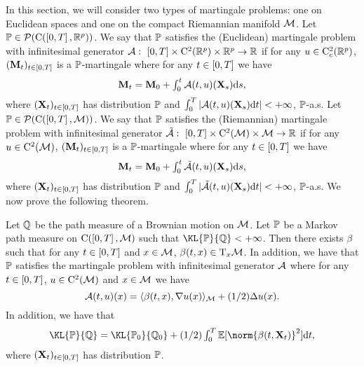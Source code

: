 In this section, we will consider two types of martingale problems: one on
Euclidean spaces and one on the compact Riemannian manifold $\mathcal M$. Let
$\mathbb{P} \in \mathcal{P}(\mathrm{C}(\left[0,T\right], \mathbb{R}^p))$. We say that $\mathbb{P}$ satisfies the
(Euclidean) martingale problem with infinitesimal generator
$\mathcal{A}: \ \left[0,T\right] \times \mathrm{C}^2(\mathbb{R}^p) \times \mathbb{R}^p \to \mathbb{R}$ if
for any $u \in \mathrm{C}_c^2(\mathbb{R}^p)$, $(\mathbf{M}_t)_{t \in \left[0,T\right]}$ is a
$\mathbb{P}$-martingale where for any $t \in \left[0,T\right]$ we have
\begin{equation}
  \textstyle{
    \mathbf{M}_t = \mathbf{M}_0 + \int_0^t \mathcal{A}(t, u)(\mathbf{X}_s) \mathrm{d}s  ,
    }
  \end{equation}
  where $(\mathbf{X}_t)_{t \in \left[0,T\right]}$ has distribution $\mathbb{P}$ and
  $\int_0^T \vert \mathcal{A}(t, u)(\mathbf{X}_s) \mathrm{d} t \vert <+\infty$, $\mathbb{P}$-a.s.
  Let $\mathbb{P} \in \mathcal{P}(\mathrm{C}(\left[0,T\right], \mathcal M))$. We say that $\mathbb{P}$ satisfies the
  (Riemannian) martingale problem with infinitesimal generator
  $\tilde{\mathcal{A}}: \ \left[0,T\right] \times \mathrm{C}^2(\mathcal M) \times \mathcal M \to \mathbb{R}$ if for any
  $u \in \mathrm{C}^2(\mathcal M)$, $(\mathbf{M}_t)_{t \in \left[0,T\right]}$ is a $\mathbb{P}$-martingale
  where for any $t \in \left[0,T\right]$ we have
\begin{equation}
  \textstyle{
    \mathbf{M}_t = \mathbf{M}_0 + \int_0^t \tilde{\mathcal{A}}(t, u)(\mathbf{X}_s) \mathrm{d}s  ,
    }
  \end{equation}
  where $(\mathbf{X}_t)_{t \in \left[0,T\right]}$ has distribution $\mathbb{P}$ and 
  $\int_0^T \vert \tilde{\mathcal{A}}(t, u)(\mathbf{X}_s) \mathrm{d} t \vert <+\infty$, $\mathbb{P}$-a.s.
  We now prove the following theorem.

  \begin{proposition}
    \label{prop:girsanov_manifold}
    Let $\mathbb{Q}$ be the path measure of a Brownian motion on $\mathcal M$. Let $\mathbb{P}$ be a
    Markov path measure on $\mathrm{C}(\left[0,T\right], \mathcal M)$ such that $\KL{\Pbb}{\Qbb} < +\infty$. Then there exists
    $\beta$ such that for any $t \in \left[0,T\right]$ and
    $x \in \mathcal M$, $\beta(t,x) \in \mathrm{T}_x \mathcal M$. In addition, we have that
    $\mathbb{P}$ satisfies the martingale problem with infinitesimal generator
    $\mathcal{A}$ where for any $t \in \left[0,T\right]$, $u \in \mathrm{C}^2(\mathcal M)$ and
    $x \in \mathcal M$ we have
    \begin{equation}
      \mathcal{A}(t,u)(x) = \langle \beta(t,x), \nabla u(x) \rangle_\mathcal M + (1/2) \Delta u(x)  . 
    \end{equation}
    In addition, we have that
    \begin{equation}
      \textstyle{\KL{\Pbb}{\Qbb} = \KL{\Pbb_0}{\Qbb_0} + (1/2) \int_0^T \expeLigne{\norm{\beta(t, \bfX_t)}^2} \rmd t  ,}
    \end{equation}
    where $(\mathbf{X}_t)_{t \in \left[0,T\right]}$ has distribution $\mathbb{P}$.
  \end{proposition}



